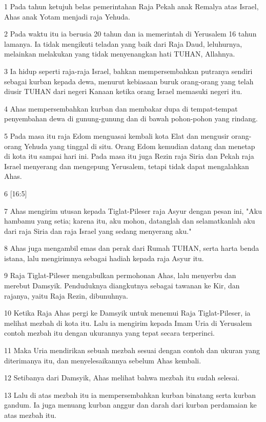 \par 1 Pada tahun ketujuh belas pemerintahan Raja Pekah anak Remalya atas Israel, Ahas anak Yotam menjadi raja Yehuda.
\par 2 Pada waktu itu ia berusia 20 tahun dan ia memerintah di Yerusalem 16 tahun lamanya. Ia tidak mengikuti teladan yang baik dari Raja Daud, leluhurnya, melainkan melakukan yang tidak menyenangkan hati TUHAN, Allahnya.
\par 3 Ia hidup seperti raja-raja Israel, bahkan mempersembahkan putranya sendiri sebagai kurban kepada dewa, menurut kebiasaan buruk orang-orang yang telah diusir TUHAN dari negeri Kanaan ketika orang Israel memasuki negeri itu.
\par 4 Ahas mempersembahkan kurban dan membakar dupa di tempat-tempat penyembahan dewa di gunung-gunung dan di bawah pohon-pohon yang rindang.
\par 5 Pada masa itu raja Edom menguasai kembali kota Elat dan mengusir orang-orang Yehuda yang tinggal di situ. Orang Edom kemudian datang dan menetap di kota itu sampai hari ini. Pada masa itu juga Rezin raja Siria dan Pekah raja Israel menyerang dan mengepung Yerusalem, tetapi tidak dapat mengalahkan Ahas.
\par 6 [16:5]
\par 7 Ahas mengirim utusan kepada Tiglat-Pileser raja Asyur dengan pesan ini, "Aku hambamu yang setia; karena itu, aku mohon, datanglah dan selamatkanlah aku dari raja Siria dan raja Israel yang sedang menyerang aku."
\par 8 Ahas juga mengambil emas dan perak dari Rumah TUHAN, serta harta benda istana, lalu mengirimnya sebagai hadiah kepada raja Asyur itu.
\par 9 Raja Tiglat-Pileser mengabulkan permohonan Ahas, lalu menyerbu dan merebut Damsyik. Penduduknya diangkutnya sebagai tawanan ke Kir, dan rajanya, yaitu Raja Rezin, dibunuhnya.
\par 10 Ketika Raja Ahas pergi ke Damsyik untuk menemui Raja Tiglat-Pileser, ia melihat mezbah di kota itu. Lalu ia mengirim kepada Imam Uria di Yerusalem contoh mezbah itu dengan ukurannya yang tepat secara terperinci.
\par 11 Maka Uria mendirikan sebuah mezbah sesuai dengan contoh dan ukuran yang diterimanya itu, dan menyelesaikannya sebelum Ahas kembali.
\par 12 Setibanya dari Damsyik, Ahas melihat bahwa mezbah itu sudah selesai.
\par 13 Lalu di atas mezbah itu ia mempersembahkan kurban binatang serta kurban gandum. Ia juga menuang kurban anggur dan darah dari kurban perdamaian ke atas mezbah itu.
